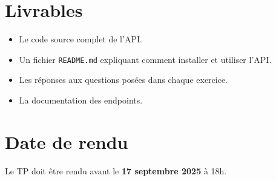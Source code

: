 \documentclass[a4paper,12pt]{article}
\begin{document}
\section*{Livrables}
\begin{itemize}
    \item Le code source complet de l’API.
    \item Un fichier \texttt{README.md} expliquant comment installer et utiliser l’API.
    \item Les réponses aux questions posées dans chaque exercice.
    \item La documentation des endpoints.
\end{itemize}

\section*{Date de rendu}
Le TP doit être rendu avant le \textbf{17 septembre 2025} à 18h.
\end{document}
